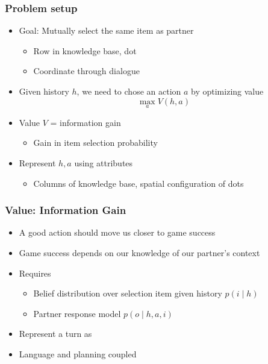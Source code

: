 \documentclass{beamer}
\begin{document}
\begin{frame}
\frametitle{Problem setup}
\begin{itemize}
\item Goal: Mutually select the same item as partner
    \begin{itemize}
    \item Row in knowledge base, dot
    \item Coordinate through dialogue
    \end{itemize}
\item Given history $h$,
we need to chose an action $a$ by optimizing value
\begin{equation*}
\max_a V(h, a)
\end{equation*}
\item Value $V$ = information gain
    \begin{itemize}
    \item Gain in item selection probability
    \end{itemize}
\item Represent $h,a$ using attributes
    \begin{itemize}
    \item Columns of knowledge base, spatial configuration of dots
    \end{itemize}
\end{itemize}
\end{frame}


\begin{frame}
\frametitle{Value: Information Gain}
\begin{itemize}
\item A good action should move us closer to game success
\item Game success depends on our knowledge of our partner's context
\item Requires
    \begin{itemize}
    \item Belief distribution over selection item given history $p(i \mid h)$
    \item Partner response model $p(o \mid h, a, i)$
    \end{itemize}
\item Represent a turn as

\begin{center}
\end{center}
\item Language and planning coupled
\end{itemize}
\end{frame}
\end{document}
